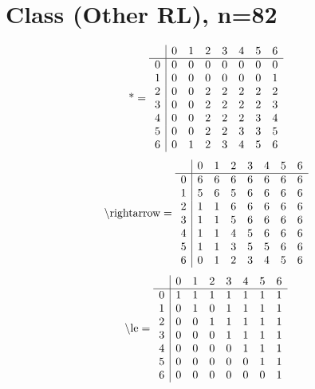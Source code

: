 \documentclass[11pt]{article}
\begin{document}
\section{Class (Other RL), n=82}
\[\text{*} = 
\begin{array}{r | r r r r r r r}
 & 0 & 1 & 2 & 3 & 4 & 5 & 6 \\ \hline
0 & 0 & 0 & 0 & 0 & 0 & 0 & 0 \\
1 & 0 & 0 & 0 & 0 & 0 & 0 & 1 \\
2 & 0 & 0 & 2 & 2 & 2 & 2 & 2 \\
3 & 0 & 0 & 2 & 2 & 2 & 2 & 3 \\
4 & 0 & 0 & 2 & 2 & 2 & 3 & 4 \\
5 & 0 & 0 & 2 & 2 & 3 & 3 & 5 \\
6 & 0 & 1 & 2 & 3 & 4 & 5 & 6 \\
\end{array}
\]
\[\text{\textbackslash rightarrow} = 
\begin{array}{r | r r r r r r r}
 & 0 & 1 & 2 & 3 & 4 & 5 & 6 \\ \hline
0 & 6 & 6 & 6 & 6 & 6 & 6 & 6 \\
1 & 5 & 6 & 5 & 6 & 6 & 6 & 6 \\
2 & 1 & 1 & 6 & 6 & 6 & 6 & 6 \\
3 & 1 & 1 & 5 & 6 & 6 & 6 & 6 \\
4 & 1 & 1 & 4 & 5 & 6 & 6 & 6 \\
5 & 1 & 1 & 3 & 5 & 5 & 6 & 6 \\
6 & 0 & 1 & 2 & 3 & 4 & 5 & 6 \\
\end{array}
\]
\[\text{\textbackslash le} = 
\begin{array}{r | r r r r r r r}
 & 0 & 1 & 2 & 3 & 4 & 5 & 6 \\ \hline
0 & 1 & 1 & 1 & 1 & 1 & 1 & 1 \\
1 & 0 & 1 & 0 & 1 & 1 & 1 & 1 \\
2 & 0 & 0 & 1 & 1 & 1 & 1 & 1 \\
3 & 0 & 0 & 0 & 1 & 1 & 1 & 1 \\
4 & 0 & 0 & 0 & 0 & 1 & 1 & 1 \\
5 & 0 & 0 & 0 & 0 & 0 & 1 & 1 \\
6 & 0 & 0 & 0 & 0 & 0 & 0 & 1 \\
\end{array}
\]
\end{document}
